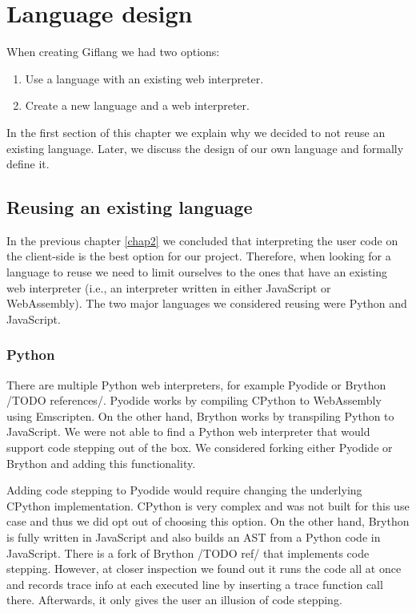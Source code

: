 
\chapter{Language design}
When creating Giflang we had two options:
\begin{enumerate}
    \item Use a language with an existing web interpreter. 
    \item Create a new language and a web interpreter.
\end{enumerate}

In the first section of this chapter we explain why we decided to not reuse an existing language. Later, we discuss the design of our own language and
formally define it.

\section{Reusing an existing language}
In the previous chapter \ref{chap2} we concluded that interpreting the user code on the client-side is the best option for our project. Therefore, when
looking for a language to reuse we need to limit ourselves to the ones that have an existing web interpreter (i.e., an interpreter written in either
JavaScript or WebAssembly). The two major languages we considered reusing were Python and JavaScript.

\subsection{Python}
There are multiple Python web interpreters, for example Pyodide or Brython /TODO references/. Pyodide works by compiling CPython to WebAssembly
using Emscripten. On the other hand, Brython works by transpiling Python to JavaScript. We were not able to find a Python web interpreter that would
support code stepping out of the box. We considered forking either Pyodide or Brython and adding this functionality.

Adding code stepping to Pyodide would require changing the underlying CPython implementation. CPython is very complex and was not built for this use case and thus
we did opt out of choosing this option. On the other hand, Brython is fully written in JavaScript and also builds an AST from a Python code in JavaScript. There
is a fork of Brython /TODO ref/ that implements code stepping. However, at closer inspection we found out it runs the code all at once and records trace info at each
executed line by inserting a trace function call there. Afterwards, it only gives the user an illusion of code stepping.


